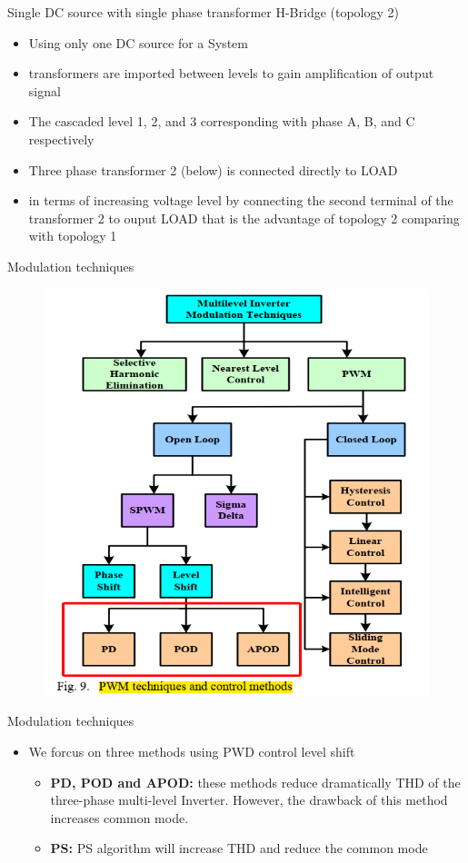 \documentclass[
	11pt, %
]{beamer}
\begin{document}
\begin{frame}{Single DC source with single phase transformer H-Bridge (topology 2)}
	\begin{itemize}
		\setlength{\itemsep}{8pt}
		\item {Using only one DC source for a System}
		\item {transformers are imported between levels to gain amplification of output signal}
		\item {The cascaded level 1, 2, and 3 corresponding with phase A, B, and C respectively}
		\item {Three phase transformer 2 (below) is connected directly to LOAD}
		\item {in terms of increasing voltage level by connecting the second terminal of the transformer 2 to ouput LOAD
		that is the advantage of topology 2 comparing with topology 1}
	\end{itemize}
\end{frame}

\begin{frame}{Modulation techniques}
    \begin{figure}
        \includegraphics[width=0.45\linewidth]{PWD.png}
    \end{figure}
\end{frame}

\begin{frame}{Modulation techniques}
    \begin{itemize}
		\item {We forcus on three methods using PWD control level shift}
		\begin{itemize}
			\setlength{\itemsep}{10pt}
			\item {\textbf{PD, POD and APOD:} these methods reduce dramatically THD of the three-phase multi-level Inverter. However, the drawback of this method increases common mode.}
			\item {\textbf{PS:} PS algorithm will increase THD and reduce the common mode}
		\end{itemize}
	\end{itemize}
\end{frame}
\end{document}
